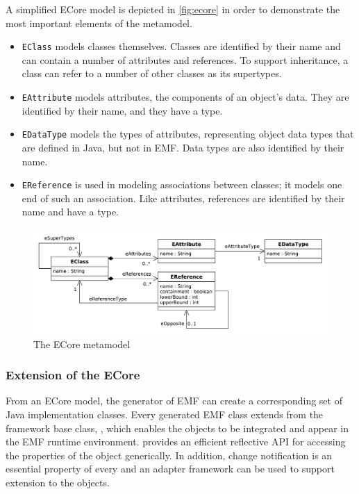 
A simplified ECore model is depicted in \autoref{fig:ecore} in order to demonstrate the most important elements of the metamodel.

\begin{itemize}
	\item \texttt{EClass} models classes themselves. Classes are identified by their name and can	contain a number of attributes and references. To support inheritance, a class can refer to a number of other classes as its supertypes.
	
	\item \texttt{EAttribute} models attributes, the components of an object’s data. They are identified by their name, and they have a type.
	
	\item \texttt{EDataType} models the types of attributes, representing object data types that are defined in Java, but not in EMF. Data types are also identified by their name.

	\item \texttt{EReference} is used in modeling associations between classes; it models one end of such an association. Like attributes, references are identified by their name and have a type.
\end{itemize}

\begin{figure}[!htp]
	\centering
	\includegraphics[width=\textwidth]{figures/pdfs/ecore-kernel.pdf}
	\caption{The ECore metamodel}
	\label{fig:ecore}
\end{figure}


\subsubsection{Extension of the ECore}
From an ECore model, the generator of EMF can create a corresponding set of Java implementation classes. Every generated EMF class extends from the framework base class, \eobject, which enables the objects to be integrated and appear in the EMF runtime environment. \eobject provides an efficient reflective API for accessing the properties of the object generically. In addition, change notification is an essential property of every \eobject and an adapter framework can be used to support extension to the objects.

